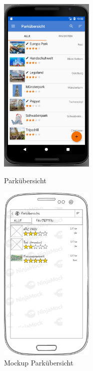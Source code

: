 \begin{figure}[h]
    \centering
    \begin{minipage}{0.49\textwidth}
        \centering
        \includegraphics[width=0.4\textwidth]{img/screenshots/ss_parkuebersicht.png}
        \caption{Parkübersicht}
		\label{figure:implementierungparkuebersicht}
    \end{minipage}
    \begin{minipage}{0.49\textwidth}
        \centering
        \includegraphics[width=0.4\textwidth]{img/mockups/m_parkuebersicht.png}
        \caption{Mockup Parkübersicht}
    \end{minipage}
\end{figure}



